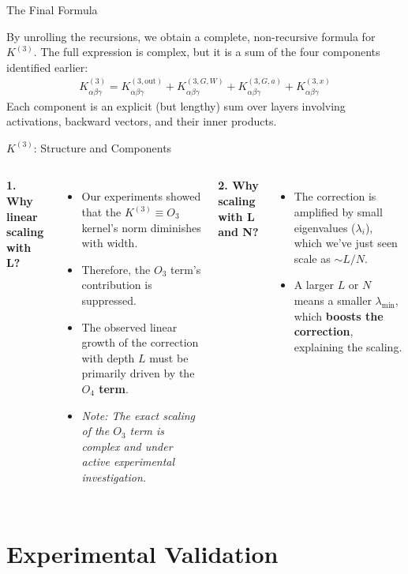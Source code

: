 \documentclass{beamer}
\begin{document}
\begin{frame}{The Final Formula}
\begin{theorem}
By unrolling the recursions, we obtain a complete, non-recursive formula for $K^{(3)}$. The full expression is complex, but it is a sum of the four components identified earlier:
\begin{align*}
K^{(3)}_{\alpha\beta\gamma} = K^{(3,\text{out})}_{\alpha\beta\gamma} + K^{(3,G,W)}_{\alpha\beta\gamma} + K^{(3,G,a)}_{\alpha\beta\gamma} + K^{(3,x)}_{\alpha\beta\gamma}
\end{align*}
Each component is an explicit (but lengthy) sum over layers involving activations, backward vectors, and their inner products.
\end{theorem}
\end{frame}

\begin{frame}{$K^{(3)}$: Structure and Components}
\begin{columns}
\textbf{1. Why linear scaling with L?}
\begin{itemize}
    \item Our experiments showed that the $K^{(3)} \equiv O_3$ kernel's norm diminishes with width.
    \item Therefore, the $O_3$ term's contribution is suppressed.
    \item The observed linear growth of the correction with depth $L$ must be primarily driven by the \textbf{$O_4$ term}.
    \item \textit{Note: The exact scaling of the $O_3$ term is complex and under active experimental investigation.}
\end{itemize}

\textbf{2. Why scaling with L and N?}
\begin{itemize}
    \item The correction is amplified by small eigenvalues ($\lambda_i$), which we've just seen scale as $\sim L/N$.
    \item A larger $L$ or $N$ means a smaller $\lambda_{\min}$, which \textbf{boosts the correction}, explaining the scaling.
\end{itemize}
\end{columns}
\end{frame}

\section{Experimental Validation}
\end{document}
